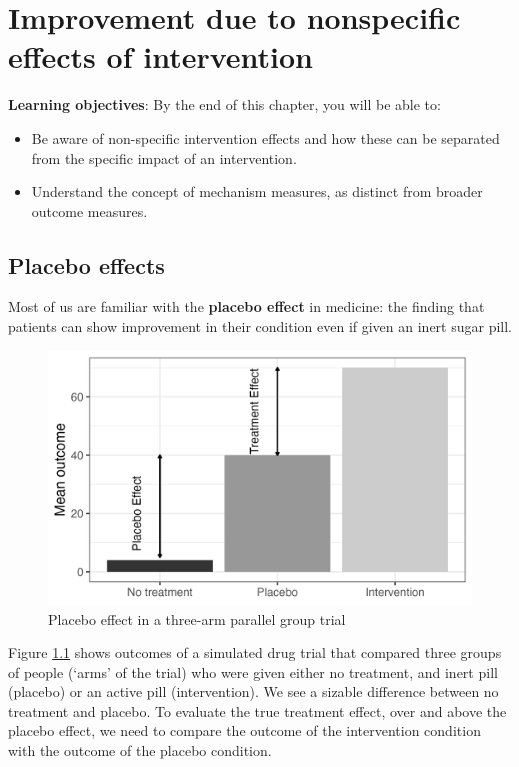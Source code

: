 \documentclass{krantz}
\begin{document}
\hypertarget{nonspecific}{%
\chapter{Improvement due to nonspecific effects of intervention}\label{nonspecific}}

\textbf{Learning objectives}: By the end of this chapter, you will be able to:

\begin{itemize}
\item
  Be aware of non-specific intervention effects and how these can be separated from the specific impact of an intervention.
\item
  Understand the concept of mechanism measures, as distinct from broader outcome measures.
\end{itemize}

\hypertarget{placebo-effects}{%
\section{Placebo effects}\label{placebo-effects}}

Most of us are familiar with the \textbf{placebo effect} in medicine: the finding that patients can show improvement in their condition even if given an inert sugar pill.

\begin{figure}
\includegraphics[width=0.75\linewidth]{images_bw/placebotab} \caption{Placebo effect in a three-arm parallel group trial}\label{fig:placebotab}
\end{figure}

Figure \ref{fig:placebotab} shows outcomes of a simulated drug trial that compared three groups of people (`arms' of the trial) who were given either no treatment, and inert pill (placebo) or an active pill (intervention). We see a sizable difference between no treatment and placebo. To evaluate the true treatment effect, over and above the placebo effect, we need to compare the outcome of the intervention condition with the outcome of the placebo condition.
\end{document}

